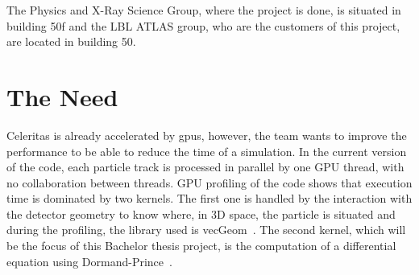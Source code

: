The Physics and X-Ray Science Group, where the project is done, is situated in building 50f and the LBL ATLAS group, who are the customers of this project, are located in building 50.


\section{The Need}
\label{spec:ch:context:need}

Celeritas is already accelerated by \acrshort{gpu}s, however, the team wants to improve the performance to be able to reduce the time of a simulation.
In the current version of the code, each particle track is processed in parallel by one GPU thread, with no collaboration between threads.
GPU profiling of the code shows that execution time is dominated by two kernels.
The first one is handled by the interaction with the detector geometry to know where, in 3D space, the particle is situated and during the profiling, the library used is vecGeom~\cite{VecGeom}.
The second kernel, which will be the focus of this Bachelor thesis project, is the computation of a differential equation using Dormand-Prince~\cite{princeDormand}.
